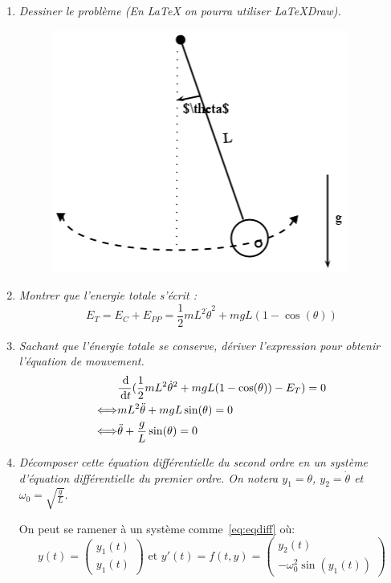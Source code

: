 \documentclass[a4paper,10pt]{article}
\begin{document}
\begin{enumerate}
    \item \emph{Dessiner le problème (En LaTeX on pourra utiliser LaTeXDraw).}
\begin{figure}[h!]
    \centering
    \includegraphics[scale=0.4]{./img/pendulum.png}
\end{figure}

    \item \emph{Montrer que l'energie totale s'écrit :}
\[
    E_T = E_C + E_{PP} = \frac{1}{2} m L^2 \dot{\theta}^2 + m g L (1 - \cos(\theta))
\]

    \item \emph{Sachant que l'énergie totale se conserve, dériver l'expression pour
    obtenir l'équation de mouvement.}
\begin{align*}
    & \frac{\,\mathrm{d}}{\,\mathrm{d} t} (\frac{1}{2} m L^2 \dot{\theta}^2 + m g L (1 -
    \cos(\theta)) - E_T) = 0\\
    \Longleftrightarrow & m L^2 \ddot{\theta} + m g L \sin(\theta) = 0\\
    \Longleftrightarrow & \ddot{\theta} + \frac{g}{L} \sin(\theta) = 0
\end{align*}

    \item \emph{Décomposer cette équation différentielle du second ordre en un système
    d'équation différentielle du premier ordre. On notera $y_1 = \theta$,
    $y_2 = \dot{\theta}$ et $\omega_0 = \sqrt{\frac{g}{L}}$.}

    On peut se ramener à un système comme~\eqref{eq:eqdiff} où:
\[
    y(t) = \left(\!
    \begin{array}{c}
        y_1(t) \\
        y_1(t)
    \end{array}
  \!\right) \text{ et }
  y'(t) = f(t, y) = \left(\!
    \begin{array}{c}
        y_2(t)\\
        -\omega_0^2 \sin(y_1(t))
    \end{array}
  \!\right)
\]


\end{enumerate}
\end{document}
